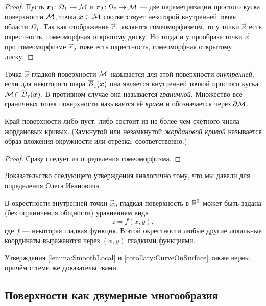 \begin{proof}
	Пусть $\boldsymbol{r}_1\colon \Omega_1 \to \mathcal{M}$ и $\boldsymbol{r}_2\colon \Omega_2 \to \mathcal{M}$ --- две параметризации простого куска поверхности $\mathcal{M}$, точка $\boldsymbol{x} \in \mathcal{M}$ соответствует некоторой внутренней точке области $\Omega_1$. Так как отображение $\vec{r}_1$ является гомеоморфизмом, то у точки $\vec{x}$ есть окрестность, гомеоморфная открытому диску. Но тогда и у прообраза точки $\vec{x}$ при гомеоморфизме $\vec{r}_2$ тоже есть окрестность, гомеоморфная открытому диску.
\end{proof}

\begin{definition}
	Точка $\vec{x}$ гладкой поверхности $\mathcal{M}$ называется для этой поверхности \textit{внутренней}, если для некоторого шара $\overline{B}_\varepsilon(\boldsymbol{x})$ она является внутренней точкой простого куска $\mathcal{M} \cap \overline{B}_\varepsilon(\boldsymbol{x})$. В противном случае она называется \textit{граничной}. Множество все граничных точек поверхности называется её \textit{краем} и обозначается через $\partial\mathcal{M}$.
\end{definition}

\begin{proposition}
	Край поверхности либо пуст, либо состоит из не более чем счётного числа жордановых кривых. (Замкнутой или незамкнутой \textit{жордановой кривой} называется образ вложения окружности или отрезка, соответственно.)
\end{proposition}

\begin{proof}
	Сразу следует из определения гомеоморфизма.
\end{proof}

Доказательство следующего утверждения аналогично тому, что мы давали для определения Олега Ивановича.

\begin{proposition}
	В окрестности внутренней точки $\vec{x}_0$ гладкая поверхность в $\mathbb{R}^3$ может быть задана (без ограничения общности) уравнением вида
	\[
		z = f(x, y),
	\]
	где $f$ --- некоторая гладкая функция. В этой окрестности любые другие локальные координаты выражаются через $(x, y)$ гладкими функциями.
\end{proposition}

Утверждения \ref{lemma:SmoothLocal} и \ref{corollary:CurveOnSurface} также верны, причём с теми же доказательствами.

\subsection{Поверхности как двумерные многообразия}

